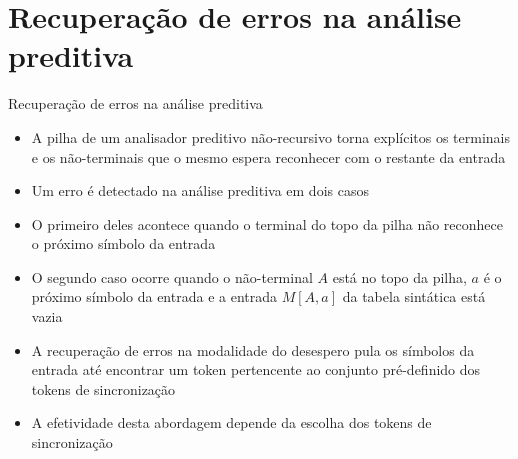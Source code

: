 \section{Recuperação de erros na análise preditiva}

\begin{frame}[fragile]{Recuperação de erros na análise preditiva}

    \begin{itemize}
        \item A pilha de um analisador preditivo não-recursivo torna explícitos os terminais e os não-terminais que o mesmo espera reconhecer com o restante
            da entrada

        \item Um erro é detectado na análise preditiva em dois casos

        \item O primeiro deles acontece quando o terminal do topo da pilha não reconhece o próximo símbolo da entrada

        \item O segundo caso ocorre quando o não-terminal $A$ está no topo da pilha, $a$ é o próximo símbolo da entrada e a entrada $M[A, a]$ da tabela sintática
            está vazia

        \item A recuperação de erros na modalidade do desespero pula os símbolos da entrada até encontrar um token pertencente ao conjunto pré-definido dos
            tokens de sincronização

        \item A efetividade desta abordagem depende da escolha dos tokens de sincronização
    \end{itemize}

\end{frame}
